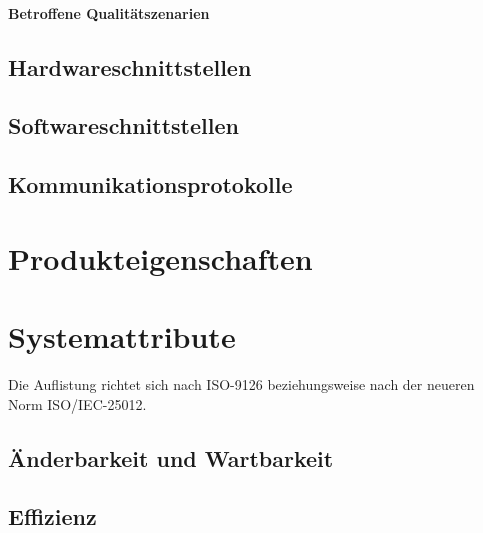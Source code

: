 \paragraph{Betroffene Qualitätszenarien} 

\subsection{Hardwareschnittstellen}
\label{srs:hardwareschnittstellen}


\subsection{Softwareschnittstellen}
\label{srs:softwareschnittstellen}


\subsection{Kommunikationsprotokolle}
\label{srs:kommunikationsprotokolle}


\section{Produkteigenschaften}
\label{srs:produkteigenschaften}


\section{Systemattribute}
\label{srs:systemattribute}


Die Auflistung richtet sich nach ISO-9126 beziehungsweise nach der
neueren Norm ISO/IEC-25012.

\subsection{Änderbarkeit und Wartbarkeit}
\label{srs:aenderbarkeit-wartbarkeit}


\subsection{Effizienz}
\label{srs:effizienz}

